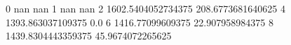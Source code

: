 0 nan nan
1 nan nan
2 1602.5404052734375 208.6773681640625
4 1393.863037109375 0.0
6 1416.77099609375 22.907958984375
8 1439.8304443359375 45.9674072265625
